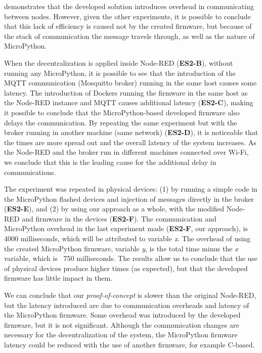  demonstrates that the developed solution introduces overhead in communicating between nodes. However, given the other experiments, it is possible to conclude that this lack of efficiency is caused not by the created firmware, but because of the stack of communication the message travels through, as well as the nature of MicroPython. 

When the decentralization is applied inside Node-RED (\cf \textbf{ES2-B}), without running any MicroPython, it is possible to see that the introduction of the MQTT communication (Mosquitto broker) running in the same host causes some latency. The introduction of Dockers running the firmware in the same host as the Node-RED instance and MQTT causes additional latency (\cf \textbf{ES2-C}), making it possible to conclude that the MicroPython-based developed firmware also delays the communication. By repeating the same experiment but with the broker running in another machine (same network) (\cf \textbf{ES2-D}), it is noticeable that the times are more spread out and the overall latency of the system increases. As the Node-RED and the broker run in different machines connected over Wi-Fi, we conclude that this is the leading cause for the additional delay in communications. 

The experiment was repeated in physical devices: (1) by running a simple code in the MicroPython flashed devices and injection of messages directly in the broker (\cf \textbf{ES2-E}), and (2) by using our approach as a whole, with the modified Node-RED and firmware in the devices (\cf \textbf{ES2-F}). The communication and MicroPython overhead in the last experiment made (\cf \textbf{ES2-F}, our approach), is 4000 milliseconds, which will be attributed to variable \textit{x}. The overhead of using the created MicroPython firmware, variable \textit{y}, is the total time minus the \textit{x} variable, which is ~750 milliseconds. The results allow us to conclude that the use of physical devices produce higher times (as expected), but that the developed firmware has little impact in them.

We can conclude that our \textit{proof-of-concept} is slower than the original Node-RED, but the latency introduced are due to communication overheads and latency of the MicroPython firmware. Some overhead was introduced by the developed firmware, but it is not significant. Although the communication changes are necessary for the decentralization of the system, the MicroPython firmware latency could be reduced with the use of another firmware, for example C-based.

